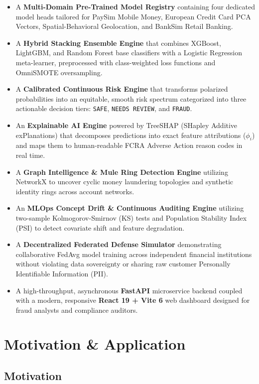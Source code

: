 \documentclass[12pt,a4paper,oneside]{report}
\begin{document}
\begin{itemize}[leftmargin=0.35in]
\item A \textbf{Multi-Domain Pre-Trained Model Registry} containing four dedicated model heads tailored for PaySim Mobile Money, European Credit Card PCA Vectors, Spatial-Behavioral Geolocation, and BankSim Retail Banking.
\item A \textbf{Hybrid Stacking Ensemble Engine} that combines XGBoost, LightGBM, and Random Forest base classifiers with a Logistic Regression meta-learner, preprocessed with class-weighted loss functions and OmniSMOTE oversampling.
\item A \textbf{Calibrated Continuous Risk Engine} that transforms polarized probabilities into an equitable, smooth risk spectrum categorized into three actionable decision tiers: \texttt{SAFE}, \texttt{NEEDS REVIEW}, and \texttt{FRAUD}.
\item An \textbf{Explainable AI Engine} powered by TreeSHAP (SHapley Additive exPlanations) that decomposes predictions into exact feature attributions ($\phi_i$) and maps them to human-readable FCRA Adverse Action reason codes in real time.
\item A \textbf{Graph Intelligence \& Mule Ring Detection Engine} utilizing NetworkX to uncover cyclic money laundering topologies and synthetic identity rings across account networks.
\item An \textbf{MLOps Concept Drift \& Continuous Auditing Engine} utilizing two-sample Kolmogorov-Smirnov (KS) tests and Population Stability Index (PSI) to detect covariate shift and feature degradation.
\item A \textbf{Decentralized Federated Defense Simulator} demonstrating collaborative FedAvg model training across independent financial institutions without violating data sovereignty or sharing raw customer Personally Identifiable Information (PII).
\item A high-throughput, asynchronous \textbf{FastAPI} microservice backend coupled with a modern, responsive \textbf{React 19 + Vite 6} web dashboard designed for fraud analysts and compliance auditors.
\end{itemize}


\section{Motivation \& Application}

\subsection{Motivation}
\end{document}
